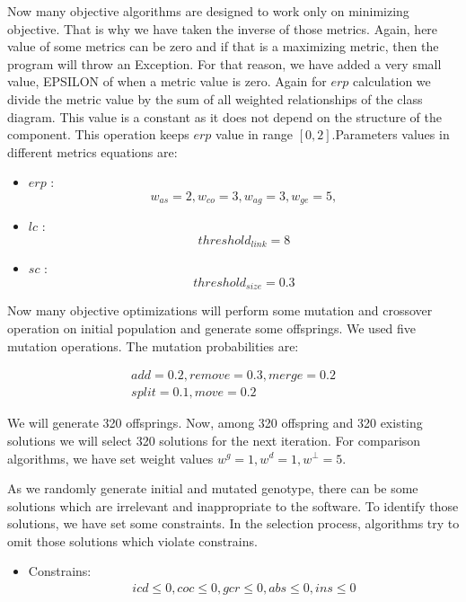 \documentclass[letterpaper, 10 pt, conference]{ieeeconf}  %
\begin{document}
Now many objective algorithms are designed to work only on minimizing objective. That is why we have taken the inverse of those metrics. Again, here value of some metrics can be zero and if that is a maximizing metric, then the program will throw an Exception. For that reason, we have added a very small value, EPSILON of when a metric value is zero. Again for $erp$ calculation we divide the metric value by the sum of all weighted relationships of the class diagram. This value is a constant as it does not depend on the structure of the component. This operation keeps $erp$ value in range $ [0,2] $.Parameters values in different metrics equations are:
\begin{itemize}
\item $erp$ :
\begin{displaymath}
w_{as}=2 , 
w_{co}=3, 
w_{ag}=3 ,
w_{ge}=5,
\end{displaymath}
\item $lc$ :
\begin{displaymath}
threshold_{link}=8
\end{displaymath}
\item $sc$ :
\begin{displaymath}
threshold_{size}=0.3
\end{displaymath}
\end{itemize}
Now many objective optimizations will perform some mutation and crossover operation on initial population and generate some offsprings. 
We used five mutation operations. The mutation probabilities are:


\begin{displaymath}
\begin{array}{l}
add=0.2 ,
remove=0.3 ,
merge=0.2 \\
split=0.1 ,
move=0.2
\end{array}
\end{displaymath}


We will generate 320 offsprings. Now, among 320 offspring and 320 existing solutions we will select 320 solutions for the next iteration.   
For comparison algorithms, we have set weight values $w^g=1,w^d=1,w^{\perp}=5$. 

As we randomly generate initial and mutated genotype, there can be some solutions which are irrelevant and inappropriate to the software. To identify those solutions, we have set some constraints. In the selection process, algorithms try to omit those solutions which violate constrains. 
\begin{itemize}
\item Constrains:
\begin{equation}
\begin{array}{l}
icd \le 0 ,
coc \le 0 , 
gcr \le 0,
abs \le 0 ,
ins \le 0
\end{array}
\end{equation}
\end{itemize}
\end{document}
